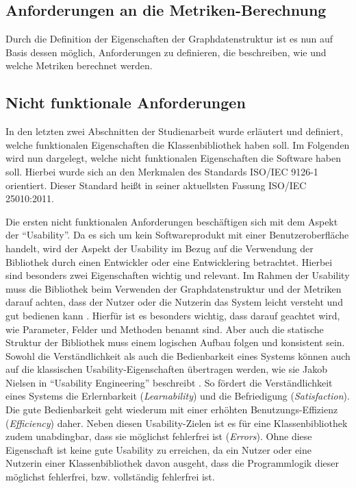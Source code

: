 \documentclass[a4paper,12pt,ngerman,chapterprefix=false,listof=totoc,bibliography=totoc]{scrreprt}
\begin{document}
{{\subsection{Anforderungen an die Metriken-Berechnung}
{
Durch die Definition der Eigenschaften der Graphdatenstruktur ist es nun auf Basis dessen möglich, Anforderungen zu definieren, die beschreiben, wie und welche Metriken berechnet werden. 
}
\subsection{Nicht funktionale Anforderungen}
{
In den letzten zwei Abschnitten der Studienarbeit wurde erläutert und definiert, welche funktionalen Eigenschaften die Klassenbibliothek haben soll. Im Folgenden wird nun dargelegt, welche nicht funktionalen Eigenschaften die Software haben soll. Hierbei wurde sich an den Merkmalen des Standards ISO/IEC 9126-1 orientiert. \cite{balzert_lehrbuch_2009} Dieser Standard heißt in seiner aktuellsten Fassung ISO/IEC 25010:2011.

Die ersten nicht funktionalen Anforderungen beschäftigen sich mit dem Aspekt der "`Usability"'. Da es sich um kein Softwareprodukt mit einer Benutzeroberfläche handelt, wird der Aspekt der Usability im Bezug auf die Verwendung der Bibliothek durch einen Entwickler oder eine Entwicklering betrachtet. Hierbei sind besonders zwei Eigenschaften wichtig und relevant. Im Rahmen der Usability muss die Bibliothek beim Verwenden der Graphdatenstruktur und der Metriken darauf achten, dass der Nutzer oder die Nutzerin das System leicht versteht und gut bedienen kann \cite{balzert_lehrbuch_2009}. Hierfür ist es besonders wichtig, dass darauf geachtet wird, wie Parameter, Felder und Methoden benannt sind. Aber auch die statische Struktur der Bibliothek muss einem logischen Aufbau folgen und konsistent sein. Sowohl die Verständlichkeit als auch die Bedienbarkeit eines Systems können auch auf die klassischen Usability-Eigenschaften übertragen werden, wie sie Jakob Nielsen in "`Usability Engineering"' beschreibt \cite{nielsen_usability_2010}. So fördert die Verständlichkeit eines Systems die Erlernbarkeit (\textit{Learnability}) und die Befriedigung (\textit{Satisfaction}). Die gute Bedienbarkeit geht wiederum mit einer erhöhten Benutzungs-Effizienz (\textit{Efficiency}) daher. Neben diesen Usability-Zielen ist es für eine Klassenbibliothek zudem unabdingbar, dass sie möglichst fehlerfrei ist (\textit{Errors}). Ohne diese Eigenschaft ist keine gute Usability zu erreichen, da ein Nutzer oder eine Nutzerin einer Klassenbibliothek davon ausgeht, dass die Programmlogik dieser möglichst fehlerfrei, bzw. vollständig fehlerfrei ist.

}}}
\end{document}
